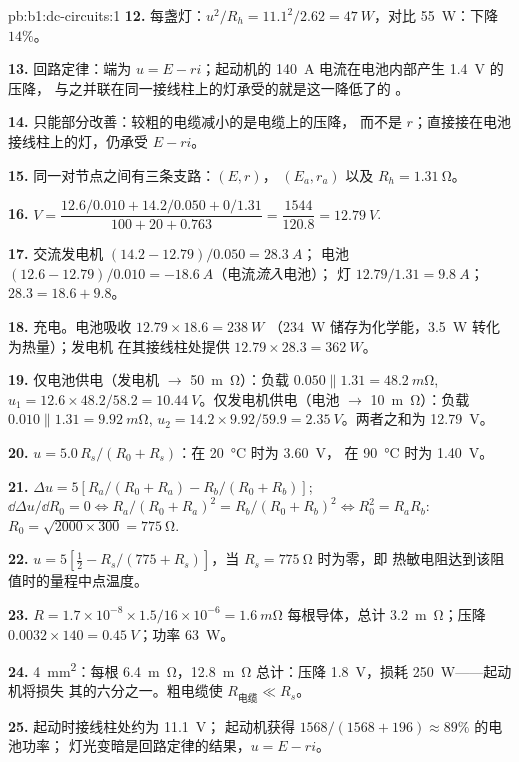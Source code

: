 \begin{solution}{pb:b1:dc-circuits:1}
\textbf{12.} 每盏灯：$u^2/R_h = 11.1^2/2.62 = \qty{47}{W}$，对比
\qty{55}{W}：下降 $14\%$。

\textbf{13.} 回路定律：端为 $u = E - ri$；起动机的
\qty{140}{A} 电流在电池内部产生 \qty{1.4}{V} 的压降，
与之并联在同一接线柱上的灯承受的就是这一降低了的
。

\textbf{14.} 只能部分改善：较粗的电缆减小的是电缆上的压降，
而不是 $r$；直接接在电池接线柱上的灯，仍承受 $E - ri$。

\textbf{15.} 同一对节点之间有三条支路：$(E, r)$，
$(E_a, r_a)$ 以及 $R_h = \qty{1.31}{\ohm}$。

\textbf{16.} $V = \dfrac{12.6/0.010 + 14.2/0.050 + 0/1.31}{100 + 20 + 0.763}
= \dfrac{1544}{120.8} = \qty{12.79}{V}$.

\textbf{17.} 交流发电机 $(14.2 - 12.79)/0.050 = \qty{28.3}{A}$；
电池 $(12.6 - 12.79)/0.010 = \qty{-18.6}{A}$（电流\emph{流入}电池）；
灯 $12.79/1.31 = \qty{9.8}{A}$；$28.3 = 18.6 + 9.8$。

\textbf{18.} 充电。电池吸收 $12.79 \times 18.6 = \qty{238}{W}$
（\qty{234}{W} 储存为化学能，\qty{3.5}{W} 转化为热量）；发电机
在其接线柱处提供 $12.79 \times 28.3 = \qty{362}{W}$。

\textbf{19.} 仅电池供电（发电机 $\to$ \qty{50}{m\ohm}）：负载
$0.050 \parallel 1.31 = \qty{48.2}{m\ohm}$, $u_1 = 12.6 \times 48.2/58.2 =
\qty{10.44}{V}$。仅发电机供电（电池 $\to$ \qty{10}{m\ohm}）：负载
$0.010 \parallel 1.31 = \qty{9.92}{m\ohm}$, $u_2 = 14.2 \times 9.92/59.9 =
\qty{2.35}{V}$。两者之和为 \qty{12.79}{V}。

\textbf{20.} $u = 5.0\,R_s/(R_0 + R_s)$：在 \qty{20}{\degreeCelsius} 时为 \qty{3.60}{V}，
在 \qty{90}{\degreeCelsius} 时为 \qty{1.40}{V}。

\textbf{21.} $\Delta u = 5[R_a/(R_0 + R_a) - R_b/(R_0 + R_b)]$;
$\dd\Delta u/\dd R_0 = 0 \Leftrightarrow R_a/(R_0 + R_a)^2 = R_b/(R_0 +
R_b)^2 \Leftrightarrow R_0^2 = R_aR_b$: $R_0 = \sqrt{2000 \times 300} =
\qty{775}{\ohm}$.

\textbf{22.} $u = 5[\tfrac12 - R_s/(775 + R_s)]$，当 $R_s =
\qty{775}{\ohm}$ 时为零，即
热敏电阻达到该阻值时的量程中点温度。

\textbf{23.} $R = 1.7\times10^{-8} \times 1.5/16\times10^{-6} =
\qty{1.6}{m\ohm}$ 每根导体，总计 \qty{3.2}{m\ohm}；压降 $0.0032
\times 140 = \qty{0.45}{V}$；功率 \qty{63}{W}。

\textbf{24.} \qty{4}{mm^2}：每根 \qty{6.4}{m\ohm}，\qty{12.8}{m\ohm}
总计：压降 \qty{1.8}{V}，损耗 \qty{250}{W}——起动机将损失
其的六分之一。粗电缆使 $R_{\text{电缆}} \ll R_s$。

\textbf{25.} 起动时接线柱处约为 \qty{11.1}{V}；
起动机获得 $1568/(1568 + 196) \approx 89\%$ 的电池功率；
灯光变暗是回路定律的结果，$u = E - ri$。
\end{solution}

